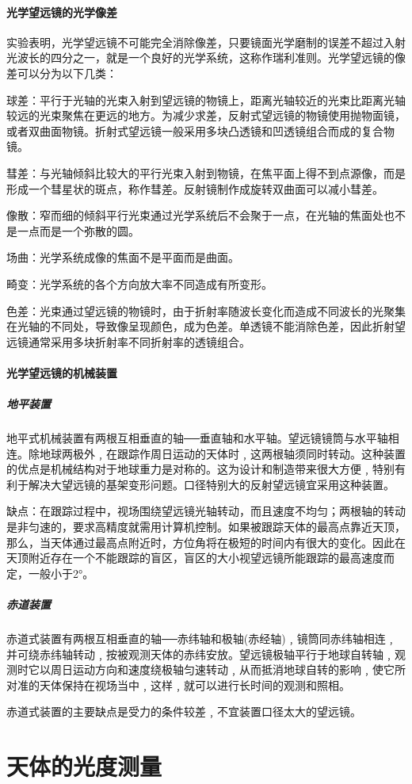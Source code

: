 \paragraph{光学望远镜的光学像差}实验表明，光学望远镜不可能完全消除像差，只要镜面光学磨制的误差不超过入射光波长的四分之一，就是一个良好的光学系统，这称作瑞利准则。光学望远镜的像差可以分为以下几类：

球差：平行于光轴的光束入射到望远镜的物镜上，距离光轴较近的光束比距离光轴较远的光束聚焦在更远的地方。为减少求差，反射式望远镜的物镜使用抛物面镜，或者双曲面物镜。折射式望远镜一般采用多块凸透镜和凹透镜组合而成的复合物镜。

彗差：与光轴倾斜比较大的平行光束入射到物镜，在焦平面上得不到点源像，而是形成一个彗星状的斑点，称作彗差。反射镜制作成旋转双曲面可以减小彗差。

像散：窄而细的倾斜平行光束通过光学系统后不会聚于一点，在光轴的焦面处也不是一点而是一个弥散的圆。

场曲：光学系统成像的焦面不是平面而是曲面。

畸变：光学系统的各个方向放大率不同造成有所变形。

色差：光束通过望远镜的物镜时，由于折射率随波长变化而造成不同波长的光聚集在光轴的不同处，导致像呈现颜色，成为色差。单透镜不能消除色差，因此折射望远镜通常采用多块折射率不同折射率的透镜组合。
\paragraph{光学望远镜的机械装置}
\subparagraph{地平装置}
地平式机械装置有两根互相垂直的轴──垂直轴和水平轴。望远镜镜筒与水平轴相连。除地球两极外﹐在跟踪作周日运动的天体时﹐这两根轴须同时转动。这种装置的优点是机械结构对于地球重力是对称的。这为设计和制造带来很大方便﹐特别有利于解决大望远镜的基架变形问题。口径特别大的反射望远镜宜采用这种装置。

缺点：在跟踪过程中，视场围绕望远镜光轴转动，而且速度不均匀；两根轴的转动是非匀速的，要求高精度就需用计算机控制。如果被跟踪天体的最高点靠近天顶，那么，当天体通过最高点附近时，方位角将在极短的时间内有很大的变化。因此在天顶附近存在一个不能跟踪的盲区，盲区的大小视望远镜所能跟踪的最高速度而定，一般小于2°。
\subparagraph{赤道装置}
赤道式装置有两根互相垂直的轴──赤纬轴和极轴(赤经轴)﹐镜筒同赤纬轴相连﹐并可绕赤纬轴转动﹐按被观测天体的赤纬安放。望远镜极轴平行于地球自转轴﹐观测时它以周日运动方向和速度绕极轴匀速转动﹐从而抵消地球自转的影响﹐使它所对准的天体保持在视场当中﹐这样﹐就可以进行长时间的观测和照相。

赤道式装置的主要缺点是受力的条件较差﹐不宜装置口径太大的望远镜。
\section{天体的光度测量}
